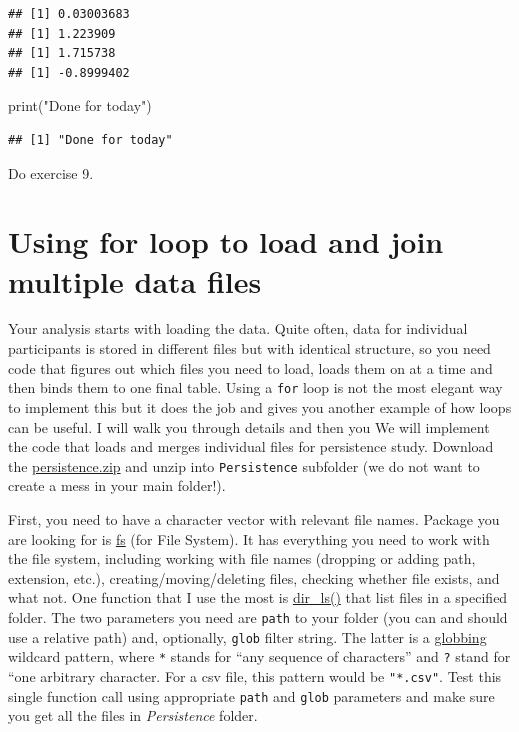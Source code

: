 \documentclass[
]{book}
\newenvironment{Shaded}{\begin{snugshade}}{\end{snugshade}}
\newcommand{\FunctionTok}[1]{\textcolor[rgb]{0.00,0.00,0.00}{#1}}
\newcommand{\NormalTok}[1]{#1}
\newcommand{\StringTok}[1]{\textcolor[rgb]{0.31,0.60,0.02}{#1}}
\begin{document}
\begin{verbatim}
## [1] 0.03003683
## [1] 1.223909
## [1] 1.715738
## [1] -0.8999402
\end{verbatim}

\begin{Shaded}
\begin{Highlighting}[]
\FunctionTok{print}\NormalTok{(}\StringTok{"Done for today"}\NormalTok{)}
\end{Highlighting}
\end{Shaded}

\begin{verbatim}
## [1] "Done for today"
\end{verbatim}

Do exercise 9.

\hypertarget{using-for-loop-to-load-and-join-multiple-data-files}{%
\section{Using for loop to load and join multiple data files}\label{using-for-loop-to-load-and-join-multiple-data-files}}

Your analysis starts with loading the data. Quite often, data for individual participants is stored in different files but with identical structure, so you need code that figures out which files you need to load, loads them on at a time and then binds them to one final table. Using a \texttt{for} loop is not the most elegant way to implement this but it does the job and gives you another example of how loops can be useful. I will walk you through details and then you We will implement the code that loads and merges individual files for persistence study. Download the \href{data/persistence.zip}{persistence.zip} and unzip into \texttt{Persistence} subfolder (we do not want to create a mess in your main folder!).

First, you need to have a character vector with relevant file names. Package you are looking for is \href{https://github.com/r-lib/fs}{fs} (for File System). It has everything you need to work with the file system, including working with file names (dropping or adding path, extension, etc.), creating/moving/deleting files, checking whether file exists, and what not. One function that I use the most is \href{https://www.rdocumentation.org/packages/fs/versions/1.5.0/topics/dir_ls}{dir\_ls()} that list files in a specified folder. The two parameters you need are \texttt{path} to your folder (you can and should use a relative path) and, optionally, \texttt{glob} filter string. The latter is a \href{https://en.wikipedia.org/wiki/Glob_(programming)}{globbing} wildcard pattern, where \texttt{*} stands for ``any sequence of characters'' and \texttt{?} stand for ``one arbitrary character. For a csv file, this pattern would be \texttt{"*.csv"}. Test this single function call using appropriate \texttt{path} and \texttt{glob} parameters and make sure you get all the files in \emph{Persistence} folder.
\end{document}
